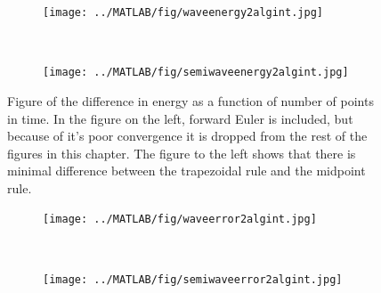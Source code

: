 \begin{figure}[H]
        \centering
        \begin{subfigure}[b]{0.45\textwidth}
                \texttt{[image: ../MATLAB/fig/waveenergy2algint.jpg]}
                \caption{  }
                \label{fig:errora}
        \end{subfigure}%
        ~
        \begin{subfigure}[b]{0.45\textwidth}
                \texttt{[image: ../MATLAB/fig/semiwaveenergy2algint.jpg]}
                \caption{  }
                \label{fig:errorb}
        \end{subfigure}
        \caption{Figure of the difference in energy as a function of number of points in time. In the figure on the left, forward Euler is included, but because of it's poor convergence it is dropped from the rest of the figures in this chapter. The figure to the left shows that there is minimal difference between the trapezoidal rule and the midpoint rule. }
        \label{fig:energy}
\end{figure}

\begin{figure}[H]
        \centering
        \begin{subfigure}[b]{0.45\textwidth}
                \texttt{[image: ../MATLAB/fig/waveerror2algint.jpg]}
                \caption{  }
                \label{fig:energya}
        \end{subfigure}%
        ~
        \begin{subfigure}[b]{0.45\textwidth}
                \texttt{[image: ../MATLAB/fig/semiwaveerror2algint.jpg]}
                \caption{  }
               \label{fig:energyb}
        \end{subfigure}
        \caption{}
        \label{fig:error}
\end{figure}

